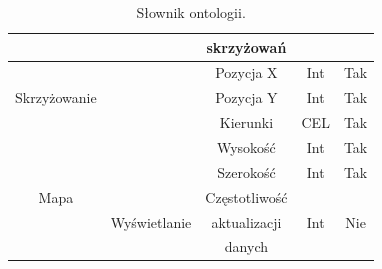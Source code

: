 \documentclass[11pt,a4paper]{article}
\begin{document}
\begin{table}[ht]
\begin{tabular}{|c|c|c|c|c|}
            & & skrzyżowań & & \\
            \hline
            \multirow{3}{*}{Skrzyżowanie} & & Pozycja X & Int & Tak \\
            \cline{3-5}
             & & Pozycja Y & Int & Tak \\
            \cline{3-5}
             & & Kierunki & CEL & Tak \\
            \hline
            \multirow{5}{*}{Mapa} & & Wysokość & Int & Tak \\
            \cline{3-5}
             & & Szerokość & Int & Tak \\
            \cline{2-5}
            & \multirow{3}{*}{Wyświetlanie} & Częstotliwość & \multirow{3}{*}{Int} & \multirow{3}{*}{Nie} \\
            & & aktualizacji & & \\
            & & danych & & \\
            \hline
        \end{tabular}

        \caption{Słownik ontologii.}
        \label{fig:ontology}
\end{table}
\end{document}

